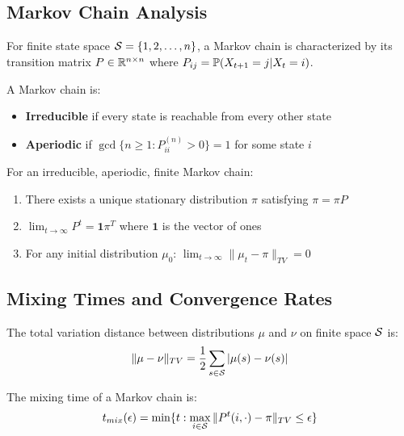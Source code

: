 \subsection{Markov Chain Analysis}

For finite state space $\mathcal{S} = \{1, 2, \ldots, n\}$, a Markov chain is characterized by its transition matrix $P \in \mathbb{R}^{n \times n}$ where $P_{ij} = \mathbb{P}(X_{t+1} = j | X_t = i)$.

\begin{definition}
A Markov chain is:
\begin{itemize}
    \item \textbf{Irreducible} if every state is reachable from every other state
    \item \textbf{Aperiodic} if $\gcd\{n \geq 1 : P_{ii}^{(n)} > 0\} = 1$ for some state $i$
\end{itemize}
\end{definition}

\begin{theorem}
For an irreducible, aperiodic, finite Markov chain:
\begin{enumerate}
    \item There exists a unique stationary distribution $\pi$ satisfying $\pi = \pi P$
    \item $\lim_{t \to \infty} P^t = \mathbf{1}\pi^T$ where $\mathbf{1}$ is the vector of ones
    \item For any initial distribution $\mu_0$: $\lim_{t \to \infty} \|\mu_t - \pi\|_{TV} = 0$
\end{enumerate}
\end{theorem}

\subsection{Mixing Times and Convergence Rates}

\begin{definition}
The total variation distance between distributions $\mu$ and $\nu$ on finite space $\mathcal{S}$ is:
\begin{equation}
\|\mu - \nu\|_{TV} = \frac{1}{2}\sum_{s \in \mathcal{S}} |\mu(s) - \nu(s)|
\end{equation}
\end{definition}

\begin{definition}
The mixing time of a Markov chain is:
\begin{equation}
t_{mix}(\epsilon) = \min\{t : \max_{i \in \mathcal{S}} \|P^t(i, \cdot) - \pi\|_{TV} \leq \epsilon\}
\end{equation}
\end{definition}

